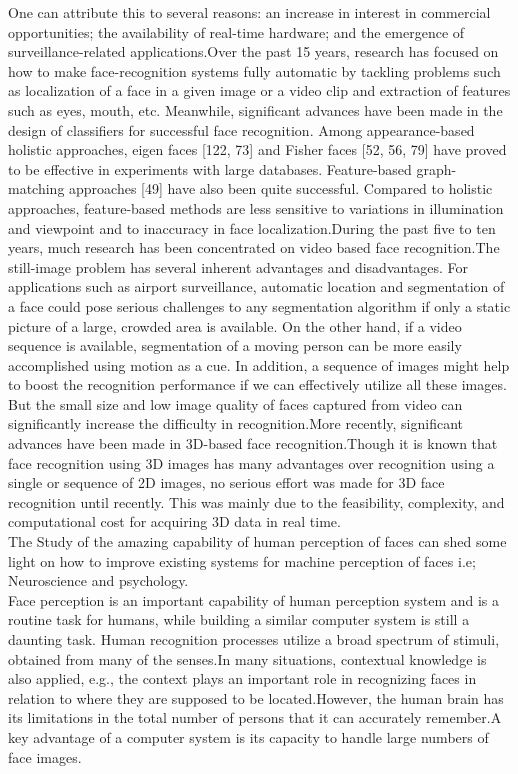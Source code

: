 \documentclass[10pt,a4paper]{article}
\begin{document}
One can attribute this to several reasons: an increase in interest in commercial
opportunities; the availability of real-time hardware; and the emergence of
surveillance-related applications.Over the past 15 years, research has focused on how to make face-recognition
systems fully automatic by tackling problems such as localization of a face in
a given image or a video clip and extraction of features such as eyes, mouth,
etc. Meanwhile, significant advances have been made in the design of classifiers
for successful face recognition. Among appearance-based holistic approaches,
eigen faces [122, 73] and Fisher faces [52, 56, 79] have proved to be effective in
experiments with large databases. Feature-based graph-matching approaches [49]
have also been quite successful. Compared to holistic approaches, feature-based methods are less sensitive to variations in illumination and viewpoint and to inaccuracy
in face localization.During the past five to ten years, much research has been concentrated on video based
face recognition.The still-image problem has several inherent advantages
and disadvantages. For applications such as airport surveillance, automatic location
and segmentation of a face could pose serious challenges to any segmentation
algorithm if only a static picture of a large, crowded area is available. On the other
hand, if a video sequence is available, segmentation of a moving person can be
more easily accomplished using motion as a cue. In addition, a sequence of images
might help to boost the recognition performance if we can effectively utilize all
these images. But the small size and low image quality of faces captured from
video can significantly increase the difficulty in recognition.More recently, significant advances have been made in 3D-based face recognition.Though it is known that face recognition using 3D images has many
advantages over recognition using a single or sequence of 2D images, no serious
effort was made for 3D face recognition until recently. This was mainly due
to the feasibility, complexity, and computational cost for acquiring 3D data in
real time.\\
The Study of the amazing capability of human
perception of faces can shed some light on how to improve existing systems
for machine perception of faces i.e; Neuroscience and psychology.\\
Face perception is an important capability of human perception system and is a
routine task for humans, while building a similar computer system is still a daunting
task. Human recognition processes utilize a broad spectrum of stimuli, obtained from many of the senses.In many situations, contextual knowledge is also applied, e.g., the context plays
an important role in recognizing faces in relation to where they are supposed to be
located.However, the
human brain has its limitations in the total number of persons that it can accurately
remember.A key advantage of a computer system is its capacity to handle large
numbers of face images.\\ \\ \\ 
\end{document}
